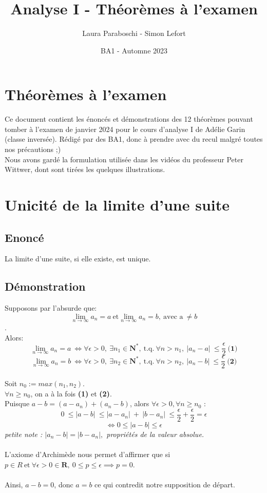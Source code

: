 \documentclass{article}
\title{Analyse I - Théorèmes à l'examen}
\author{Laura Paraboschi - Simon Lefort}
\date{BA1 - Automne 2023}
\begin{document}
\maketitle

\section{Théorèmes à l'examen}

Ce document contient les énoncés et démonstrations des 12 théorèmes pouvant tomber à l'examen de janvier 2024 pour le cours d'analyse I de Adélie Garin (classe inversée). Rédigé par des BA1, donc à prendre avec du recul malgré toutes nos précautions ;)\\
Nous avons gardé la formulation utilisée dans les vidéos du professeur Peter Wittwer, dont sont tirées les quelques illustrations.

\newpage

\section{Unicité de la limite d'une suite}

\subsection{Enoncé}

La limite d'une suite, si elle existe, est unique.

\subsection{Démonstration}

Supposons par l'absurde que:
\[ \lim_{n\to\infty}a_n = a\ \text{et} \lim_{n\to\infty}a_n = b,\ \text{avec a}\ \neq b \].\\
Alors:
\[ \lim_{n\to\infty}a_n = a\ \Leftrightarrow \forall \epsilon > 0,\ \exists n_1 \in \mathbf{N^*},\ \text{t.q.}\ \forall n > n_1,\ \lvert a_n - a \lvert\ \leq \frac{\epsilon}{2}\ \textbf{(1)}\]
\[ \lim_{n\to\infty}a_n = b\ \Leftrightarrow \forall \epsilon > 0,\ \exists n_2 \in \mathbf{N^*},\ \text{t.q.}\ \forall n > n_2,\ \lvert a_n - b \lvert\ \leq \frac{\epsilon}{2}\ \textbf{(2)}\]\\
Soit $ n_0 := max(n_1, n_2) $.\\
$ \forall n \geq n_0 $, on a à la fois \textbf{(1)} et \textbf{(2)}.\\
Puisque $ a - b = (a - a_n) + (a_n - b) $, alors $\forall \epsilon > 0, \forall n \geq n_0 $ :\\
\[ 0\ \leq \lvert a - b \lvert\ \leq \lvert a - a_n \lvert\ +\ \lvert b - a_n \lvert\ \leq \frac{\epsilon}{2} + \frac{\epsilon}{2} = \epsilon \]
\[ \Leftrightarrow 0 \leq |a-b| \leq \epsilon \]
\textit{petite note : $ |a_n - b| = |b - a_n|, $ propriétés de la valeur absolue.}\\\\
L'axiome d'Archimède nous permet d'affirmer que si $ p \in R\ \text{et}\ \forall \epsilon > 0 \in \mathbf{R},\ 0 \leq p \leq \epsilon \implies p = 0 $. \\\\
Ainsi, $ a - b = 0 $, donc $ a = b $ ce qui contredit notre supposition de départ.
\end{document}
